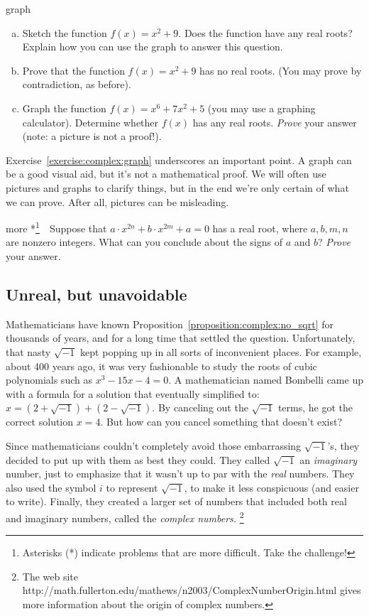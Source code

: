 \begin{exercise}{graph}
\begin{enumerate}[(a)]
\item
Sketch the function  $f(x) = x^2 + 9$. Does the function have any real roots? Explain how you can use the graph to answer this question.
\item 
Prove that the function $f(x) = x^2 + 9$ has no real roots.  (You may prove by contradiction, as before). 
\item
Graph the function $f(x) = x^6 + 7x^2 + 5$ (you may use a graphing calculator). Determine whether $f(x)$ has any real roots. \emph{Prove} your answer (note: a picture is not a proof!).
\end{enumerate}
\end{exercise}
\noindent
Exercise~\ref{exercise:complex:graph} underscores an important point. A graph can be a good visual aid, but it's not a mathematical proof.  We will often use pictures and graphs to clarify things, but in the end we're only certain of what we can prove. After all, pictures can be misleading.

\begin{exercise}{more}
*\footnote{Asterisks (*) indicate problems that are more difficult. Take the challenge!}~~Suppose that $a \cdot x^{2n} + b \cdot x^{2m} +a = 0$ has a real root, where $a,b,m,n$ are nonzero integers. What can you conclude about the signs of $a$ and $b$? \emph{Prove} your answer.
\end{exercise}

\subsection{Unreal, but unavoidable}

Mathematicians have known Proposition~\ref{proposition:complex:no_sqrt} for thousands of years, and
for a long time that settled the question. Unfortunately, that nasty
$\sqrt{-1}$ kept popping up in all sorts of inconvenient places.
For example, about 400 years ago, it was very fashionable to study
the roots of cubic polynomials such as $x^{3}-15x-4=0$. A mathematician
named Bombelli came up with a formula for a solution that eventually
simplified to: $x = (2 + \sqrt{-1}) + (2 - \sqrt{-1})$. By canceling
out the $\sqrt{-1}$ terms, he got the correct solution $x=4$.
But how can you cancel something that doesn't exist?

Since mathematicians couldn't completely avoid those embarrassing 
$\sqrt{-1}$'s, they decided to put up with them as best they could. They
called $\sqrt{-1}$ an \emph{imaginary} number, just to emphasize
that it wasn't up to par with the \emph{real} numbers. They also used the symbol $i$ to represent $\sqrt{-1}$, to make it less
conspicuous (and easier to write). Finally, they created a larger
set of numbers that included both real and imaginary numbers, called
the \emph{complex numbers.}
\footnote{The web site http://math.fullerton.edu/mathews/n2003/ComplexNumberOrigin.html
gives more information about the origin of complex numbers.}

